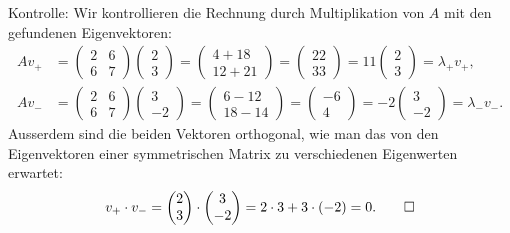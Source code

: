 \begin{loesung}
Kontrolle: Wir kontrollieren die Rechnung durch Multiplikation von $A$
mit den gefundenen Eigenvektoren:
\begin{align*}
Av_+&=\begin{pmatrix}2&6\\6&7\end{pmatrix}\begin{pmatrix}2\\3\end{pmatrix}
=\begin{pmatrix}4+18\\ 12 + 21\end{pmatrix}
=\begin{pmatrix}22\\ 33\end{pmatrix}=11\begin{pmatrix}2\\3\end{pmatrix}
=\lambda_+v_+,\\
Av_-&=\begin{pmatrix}2&6\\6&7\end{pmatrix}\begin{pmatrix}3\\-2\end{pmatrix}
=\begin{pmatrix}6-12\\18-14 \end{pmatrix}
=\begin{pmatrix}-6\\4 \end{pmatrix}=-2\begin{pmatrix}3\\-2\end{pmatrix}
=\lambda_-v_-.
\end{align*}
Ausserdem sind die beiden Vektoren orthogonal, wie man das von den Eigenvektoren
einer symmetrischen Matrix zu verschiedenen Eigenwerten erwartet:
\[
v_+\cdot v_-=
\begin{pmatrix}2\\3\end{pmatrix}
\cdot
\begin{pmatrix}3\\-2\end{pmatrix}
=2\cdot 3 + 3\cdot(-2)=0.
\qedhere
\]
\end{loesung}

